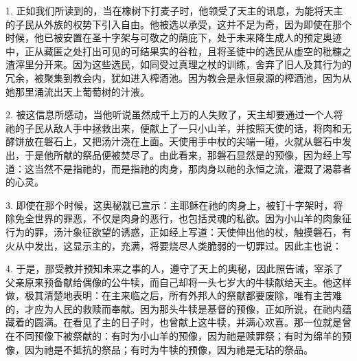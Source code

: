 1. 正如我们所读到的，当在橡树下打麦子时，他领受了天主的讯息，为能将天主的子民从外族的权势下引入自由。他被选以承受，这并不足为奇，因为即使在那个时候，他已被安置在圣十字架与可敬之的荫庇下，处于未来降生成人的预定奥迹中，正从藏匿之处打出可见的可结果实的谷粒，且\Emph{[奥妙地]}将圣徒中的选民从虚空的秕糠之渣滓里分开来。因为这些选民，如同受过真理之杖的训练，舍弃了旧人及其行为的冗余，被聚集到教会内，犹如进入榨酒池。因为教会是永恒泉源的榨酒池，因为从她那里涌流出天上葡萄树的汁液。\par

2. 被这信息所感动，当他听说虽然成千上万的人失败了，天主却要通过一个人将祂的子民从敌人手中拯救出来，便献上了一只小山羊，并按照天使的话，将肉和无酵饼放在磐石上，又把汤汁浇在上面。天使用手中杖的尖端一碰，火就从磐石中发出，于是他所献的祭品便被焚尽了。由此看来，那磐石显然是的预像，因为经上写道：这当然不是指祂的，而是指祂的肉身，那肉身以祂的永恒之流，灌溉了渴慕者的心灵。\par

3. 即使在那个时候，这奥秘就已宣示：主耶稣在祂的肉身上，被钉十字架时，将除免全世界的罪恶，不仅是肉身的恶行，也包括灵魂的私欲。因为小山羊的肉象征行为的罪，汤汁象征欲望的诱惑，正如经上写道：天使伸出他的杖，触摸磐石，有火从中发出，这显示主的，充满，将要烧尽人类脆弱的一切罪过。因此主也说：\par

4. 于是，那受教并预知未来之事的人，遵守了天上的奥秘，因此照告诫，宰杀了父亲原来预备献给偶像的公牛犊，而自己却将一头七岁大的牛犊献给天主。他这样做，极其清楚地表明：在主来临之后，所有外邦人的祭献都要废除，唯有主苦难的，才应为人民的救赎而奉献。因为那头牛犊是基督的预像，正如所说，在祂内蕴藏着的圆满。在看见了主的日子时，也曾献上这牛犊，并满心欢喜。那一位就是曾在不同预像下被祭献的：有时为小山羊的预像，因为祂是赎罪祭；有时为绵羊的预像，因为祂是不抵抗的祭品；有时为牛犊的预像，因为祂是无玷的祭品。\par

